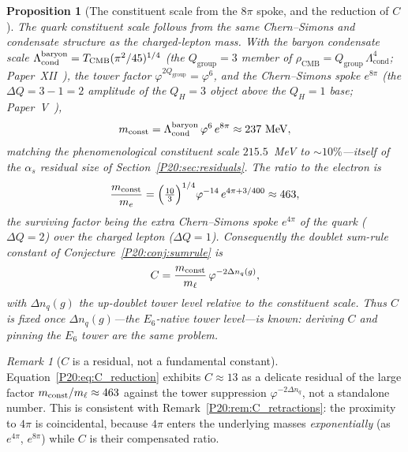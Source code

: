 \documentclass[11pt,a4paper]{article}
\newtheorem{proposition}[theorem]{Proposition}
\theoremstyle{definition}\newtheorem{definition}[theorem]{Definition}
\theoremstyle{remark}
\newtheorem{remark}[theorem]{Remark}
\newcommand{\vp}{\varphi}
\newcommand{\TCMB}{T_{\mathrm{CMB}}}
\newcommand{\Lcond}{\Lambda_{\mathrm{cond}}}
\newcommand{\rCMB}{\rho_{\mathrm{CMB}}}
\newcommand{\QH}{Q_H}
\newcommand{\Qgr}{Q_{\mathrm{group}}}
\newcommand{\alphas}{\alpha_s}
\begin{document}
\begin{proposition}[The constituent scale from the $8\pi$ spoke, and the reduction of $C$]
\label{P20:prop:constituent}
The quark constituent scale follows from the same Chern--Simons and
condensate structure as the charged-lepton mass. With the baryon
condensate scale $\Lcond^{\rm baryon}=\TCMB(\pi^2/45)^{1/4}$ (the
$\Qgr=3$ member of $\rCMB=\Qgr\,\Lcond^4$; Paper~XII~\cite{Paper12}), the
tower factor $\vp^{2\Qgr}=\vp^6$, and the Chern--Simons spoke $e^{8\pi}$
(the $\Delta Q=3-1=2$ amplitude of the $\QH=3$ object above the $\QH=1$
base; Paper~V~\cite{Paper5}),
\begin{equation}
  m_{\rm const}=\Lcond^{\rm baryon}\,\vp^{6}\,e^{8\pi}\approx237~\mathrm{MeV},
  \label{P20:eq:constituent}
\end{equation}
matching the phenomenological constituent scale $215.5$~MeV to
$\sim10\%$---itself of the $\alphas$ residual size of
Section~\ref{P20:sec:residuals}. The ratio to the electron is
\begin{equation}
  \frac{m_{\rm const}}{m_e}
  =\Bigl(\tfrac{10}{3}\Bigr)^{1/4}\vp^{-14}\,e^{4\pi+3/400}\approx463,
  \label{P20:eq:const_over_me}
\end{equation}
the surviving factor being the \emph{extra} Chern--Simons spoke $e^{4\pi}$
of the quark ($\Delta Q=2$) over the charged lepton ($\Delta Q=1$).
Consequently the doublet sum-rule constant of
Conjecture~\ref{P20:conj:sumrule} is
\begin{equation}
  C=\frac{m_{\rm const}}{m_\ell}\,\vp^{-2\Delta n_q(g)},
  \label{P20:eq:C_reduction}
\end{equation}
with $\Delta n_q(g)$ the up-doublet tower level relative to the
constituent scale. Thus $C$ is fixed once $\Delta n_q(g)$---the
$E_6$-native tower level---is known: deriving $C$ and pinning the $E_6$
tower are the same problem.
\end{proposition}

\begin{remark}[$C$ is a residual, not a fundamental constant]
\label{P20:rem:C_residual}
Equation~\eqref{P20:eq:C_reduction} exhibits $C\approx13$ as a delicate
residual of the large factor $m_{\rm const}/m_\ell\approx463$ against the
tower suppression $\vp^{-2\Delta n_q}$, not a standalone number. This is
consistent with Remark~\ref{P20:rem:C_retractions}: the proximity to
$4\pi$ is coincidental, because $4\pi$ enters the underlying masses
\emph{exponentially} (as $e^{4\pi}$, $e^{8\pi}$) while $C$ is their
compensated ratio.
\end{remark}
\end{document}
